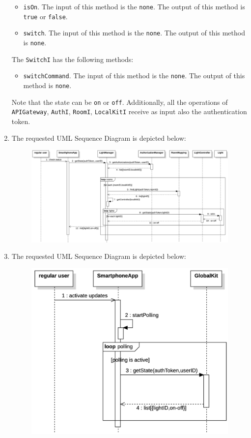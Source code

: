 \begin{enumerate}
        \begin{itemize} 
            \item \texttt{isOn}. 
                The input of this method is the \texttt{none}.
                The output of this method is \texttt{true} or \texttt{false}.
            \item \texttt{switch}. 
                The input of this method is the \texttt{none}.
                The output of this method is \texttt{none}.
        \end{itemize}
        The \texttt{SwitchI} has the following methods: 
        \begin{itemize} 
            \item \texttt{switchCommand}. 
                The input of this method is the \texttt{none}.
                The output of this method is \texttt{none}.
        \end{itemize}
        Note that the state can be \texttt{on} or \texttt{off}. 
        Additionally, all the operations of \texttt{APIGateway}, \texttt{AuthI}, \texttt{RoomI}, \texttt{LocalKitI} receive as input also the authentication token. 
    \item The requested UML Sequence Diagram is depicted below: 
        \begin{figure}[H]
            \centering
            \includegraphics[width=0.9\linewidth]{images/sd.png}
        \end{figure}
    \item The requested UML Sequence Diagram is depicted below: 
        \begin{figure}[H]
            \centering
            \includegraphics[width=0.9\linewidth]{images/sd1.png}

\end{figure}
\end{enumerate}
